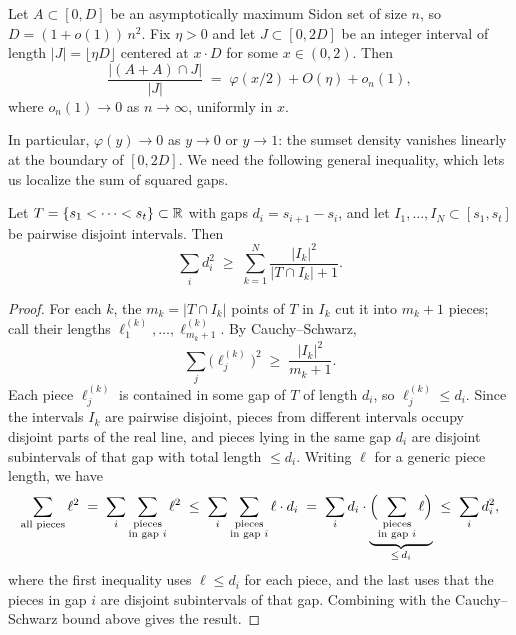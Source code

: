 \documentclass[11pt]{amsart}
\begin{document}
\begin{lemma}\label{lem:density}
Let $A \subset [0,D]$ be an asymptotically maximum Sidon set of size $n$, so $D = (1+o(1))\,n^2$. Fix $\eta > 0$ and let $J \subset [0, 2D]$ be an integer interval of length $|J| = \lfloor \eta D \rfloor$ centered at $x \cdot D$ for some $x \in (0,2)$. Then
\[
\frac{|(A+A) \cap J|}{|J|} \;=\; \varphi(x/2) + O(\eta) + o_n(1),
\]
where $o_n(1) \to 0$ as $n \to \infty$, uniformly in $x$.
\end{lemma}

In particular, $\varphi(y) \to 0$ as $y \to 0$ or $y \to 1$: the sumset density vanishes linearly at the boundary of $[0, 2D]$.
We need the following general inequality, which lets us localize the sum of squared gaps.
\begin{lemma}[Localization]\label{lem:local}
Let $T = \{s_1 < \cdots < s_t\} \subset \mathbb R$ with gaps $d_i = s_{i+1} - s_i$, and let $I_1, \ldots, I_N \subset [s_1, s_t]$ be pairwise disjoint intervals. Then
\[
\sum_i d_i^2 \;\geq\; \sum_{k=1}^{N} \frac{|I_k|^2}{|T \cap I_k| + 1}.
\]
\end{lemma}

\begin{proof}
For each $k$, the $m_k = |T \cap I_k|$ points of $T$ in $I_k$ cut it into $m_k + 1$ pieces; call their lengths $\ell_1^{(k)}, \ldots, \ell_{m_k+1}^{(k)}$. By Cauchy--Schwarz,
\[
\sum_j \bigl(\ell_j^{(k)}\bigr)^2 \;\geq\; \frac{|I_k|^2}{m_k + 1}.
\]
Each piece $\ell_j^{(k)}$ is contained in some gap of $T$ of length $d_i$, so $\ell_j^{(k)} \leq d_i$. Since the intervals $I_k$ are pairwise disjoint, pieces from different intervals occupy disjoint parts of the real line, and pieces lying in the same gap $d_i$ are disjoint subintervals of that gap with total length $\leq d_i$. Writing $\ell$ for a generic piece length, we have
\[
\sum_{\text{all pieces}} \ell^2
\;=\; \sum_i \sum_{\substack{\text{pieces} \\ \text{in gap }i}} \ell^2
\;\leq\; \sum_i \sum_{\substack{\text{pieces} \\ \text{in gap }i}} \ell \cdot d_i
\;=\; \sum_i d_i \cdot \underbrace{\Bigl(\sum_{\substack{\text{pieces} \\ \text{in gap }i}} \ell\Bigr)}_{\leq\, d_i}
\;\leq\; \sum_i d_i^2,
\]
where the first inequality uses $\ell \leq d_i$ for each piece, and the last uses that the pieces in gap $i$ are disjoint subintervals of that gap. Combining with the Cauchy--Schwarz bound above gives the result.
\end{proof}
\end{document}
